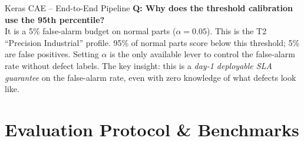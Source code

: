 \documentclass[aspectratio=169,10pt]{beamer}
\begin{document}
\begin{frame}{Keras CAE -- End-to-End Pipeline}
{  \textbf{Q: Why does the threshold calibration use the 95th percentile?}\\[0.5pt]
  It is a 5\% false-alarm budget on normal parts ($\alpha = 0.05$).
  This is the T2 ``Precision Industrial'' profile. 95\% of normal parts score below
  this threshold; 5\% are false positives. Setting $\alpha$ is the only
  available lever to control the false-alarm rate without defect labels.
  The key insight: this is a \emph{day-1 deployable SLA guarantee} on the false-alarm
  rate, even with zero knowledge of what defects look like.
}
\end{frame}

\section{Evaluation Protocol \& Benchmarks}
\end{document}
